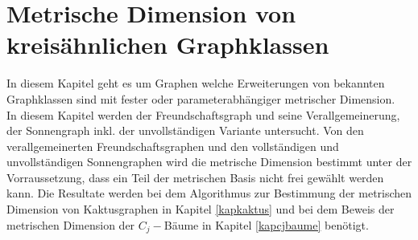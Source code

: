 \chapter{Metrische Dimension von kreisähnlichen Graphklassen}
In diesem Kapitel geht es um Graphen welche Erweiterungen von bekannten Graphklassen sind mit fester oder parameterabhängiger metrischer Dimension.\\In diesem Kapitel werden der Freundschaftsgraph und seine Verallgemeinerung, der Sonnengraph inkl. der unvollständigen Variante untersucht.
Von den verallgemeinerten Freundschaftsgraphen und den vollständigen und unvollständigen Sonnengraphen wird die metrische Dimension bestimmt unter der Vorraussetzung, dass ein Teil der metrischen Basis nicht frei gewählt werden kann. Die Resultate werden bei dem Algorithmus zur Bestimmung der metrischen Dimension von Kaktusgraphen in Kapitel \ref{kapkaktus} und bei dem Beweis der metrischen Dimension der $C_j-$Bäume in Kapitel \ref{kapcjbaume} benötigt.
\vspace{-4mm}
